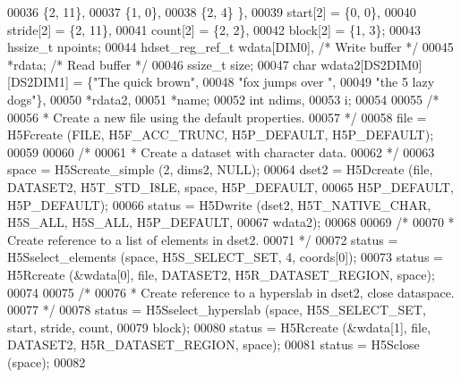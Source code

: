 \begin{DoxyCode}
00036                                          \{2, 11\},
00037                                          \{1,  0\},
00038                                          \{2,  4\} \},
00039                         start[2] = \{0, 0\},
00040                         stride[2] = \{2, 11\},
00041                         count[2] = \{2, 2\},
00042                         block[2] = \{1, 3\};
00043     hssize\_t            npoints;
00044     hdset\_reg\_ref\_t     wdata[DIM0],                \textcolor{comment}{/* Write buffer */}
00045                         *rdata;                     \textcolor{comment}{/* Read buffer */}
00046     ssize\_t             size;
00047     \textcolor{keywordtype}{char}                wdata2[DS2DIM0][DS2DIM1] = \{\textcolor{stringliteral}{"The quick brown"},
00048                                                     \textcolor{stringliteral}{"fox jumps over "},
00049                                                     \textcolor{stringliteral}{"the 5 lazy dogs"}\},
00050                         *rdata2,
00051                         *name;
00052     \textcolor{keywordtype}{int}                 ndims,
00053                         i;
00054 
00055     \textcolor{comment}{/*}
00056 \textcolor{comment}{     * Create a new file using the default properties.}
00057 \textcolor{comment}{     */}
00058     file = H5Fcreate (FILE, H5F\_ACC\_TRUNC, H5P\_DEFAULT, H5P\_DEFAULT);
00059 
00060     \textcolor{comment}{/*}
00061 \textcolor{comment}{     * Create a dataset with character data.}
00062 \textcolor{comment}{     */}
00063     space = H5Screate\_simple (2, dims2, NULL);
00064     dset2 = H5Dcreate (file, DATASET2, H5T\_STD\_I8LE, space, H5P\_DEFAULT,
00065                 H5P\_DEFAULT, H5P\_DEFAULT);
00066     status = H5Dwrite (dset2, H5T\_NATIVE\_CHAR, H5S\_ALL, H5S\_ALL, H5P\_DEFAULT,
00067                 wdata2);
00068 
00069     \textcolor{comment}{/*}
00070 \textcolor{comment}{     * Create reference to a list of elements in dset2.}
00071 \textcolor{comment}{     */}
00072     status = H5Sselect\_elements (space, H5S\_SELECT\_SET, 4, coords[0]);
00073     status = H5Rcreate (&wdata[0], file, DATASET2, H5R\_DATASET\_REGION, space);
00074 
00075     \textcolor{comment}{/*}
00076 \textcolor{comment}{     * Create reference to a hyperslab in dset2, close dataspace.}
00077 \textcolor{comment}{     */}
00078     status = H5Sselect\_hyperslab (space, H5S\_SELECT\_SET, start, stride, count,
00079                 block);
00080     status = H5Rcreate (&wdata[1], file, DATASET2, H5R\_DATASET\_REGION, space);
00081     status = H5Sclose (space);
00082 

\end{DoxyCode}
